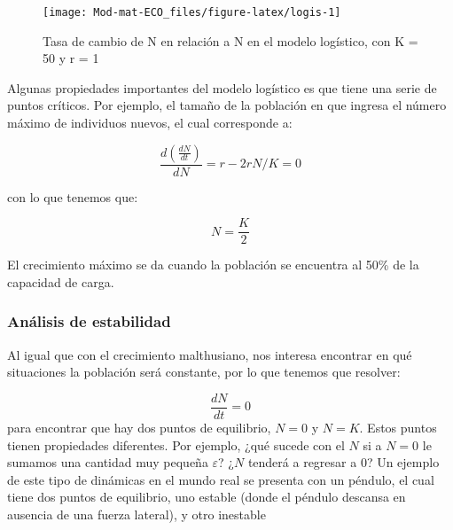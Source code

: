 \documentclass[
]{book}
\begin{document}
\begin{figure}

{\centering \texttt{[image: Mod-mat-ECO\_files/figure-latex/logis-1]} 

}

\caption{Tasa de cambio de N en relación a N en el modelo logístico, con K = 50 y r = 1}\label{fig:logis}
\end{figure}

Algunas propiedades importantes del modelo logístico es que tiene una serie de puntos críticos. Por ejemplo, el tamaño de la población en que ingresa el número máximo de individuos nuevos, el cual corresponde a:

\begin{equation}
\frac{d\left( \frac{dN}{dt} \right)}{dN} = r - 2rN/K = 0
\end{equation}

con lo que tenemos que:

\[ N= \frac{K}{2}\]

El crecimiento máximo se da cuando la población se encuentra al 50\% de la capacidad de carga.

\hypertarget{anuxe1lisis-de-estabilidad-1}{%
\subsubsection{Análisis de estabilidad}\label{anuxe1lisis-de-estabilidad-1}}

Al igual que con el crecimiento malthusiano, nos interesa encontrar en qué situaciones la población será constante, por lo que tenemos que resolver:

\[\frac{dN}{dt} = 0\]
para encontrar que hay dos puntos de equilibrio, \(N = 0\) y \(N = K\). Estos puntos tienen propiedades diferentes. Por ejemplo, ¿qué sucede con el \(N\) si a \(N=0\) le sumamos una cantidad muy pequeña \(\varepsilon\)? ¿\(N\) tenderá a regresar a \(0\)? Un ejemplo de este tipo de dinámicas en el mundo real se presenta con un péndulo, el cual tiene dos puntos de equilibrio, uno estable (donde el péndulo descansa en ausencia de una fuerza lateral), y otro inestable
\end{document}
